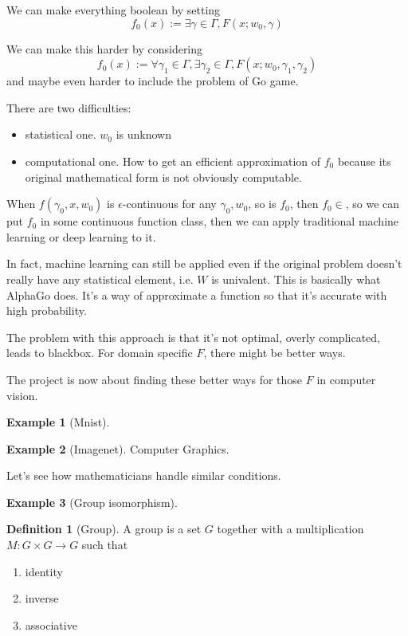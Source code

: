 \documentclass[11pt, oneside]{article}   	%
\theoremstyle{definition}
\newtheorem*{defn}{Definition}
\newtheorem*{eg}{Example}
\begin{document}
We can make everything boolean by setting
\begin{equation}
	f_0(x) := \exists\gamma \in \Gamma, F(x;w_0, \gamma)
\end{equation}

We can make this harder by considering
\begin{equation}
	f_0(x) := \forall \gamma_1\in \Gamma, \exists \gamma_2\in \Gamma, F(x;w_0, \gamma_1, \gamma_2)
\end{equation}
and maybe even harder to include the problem of Go game.

There are two difficulties:
\begin{itemize}
	\item statistical one. $w_0$ is unknown
	\item computational one. How to get an efficient approximation of $f_0$ because its original mathematical form is not obviously computable.
\end{itemize}

When $f(\gamma_0,x,w_0)$ is $\epsilon$-continuous for any $\gamma_0, w_0$, so is $f_0$, then $f_0\in$, so we can put $f_0$ in some continuous function class, then we can apply traditional machine learning or deep learning to it.

In fact, machine learning can still be applied even if the original problem doesn't really have any statistical element, i.e. $W$ is univalent. This is basically what AlphaGo does. It's a way of approximate a function so that it's accurate with high probability.

The problem with this approach is that it's not optimal, overly complicated, leads to blackbox. For domain specific $F$, there might be better ways.


The project is now about finding these better ways for those $F$ in computer vision.

\begin{eg}
	[Mnist]
\end{eg}

\begin{eg}
	[Imagenet]

	Computer Graphics.
\end{eg}

Let's see how mathematicians handle similar conditions.

\begin{eg}
	[Group isomorphism]

	\begin{defn}[Group]
		A group is a set $G$ together with a multiplication $M: G\times G\to G$ such that
		\begin{enumerate}[(1)]
			\item identity
			\item inverse
			\item associative
		\end{enumerate}
	\end{defn}
\end{eg}
\end{document}
